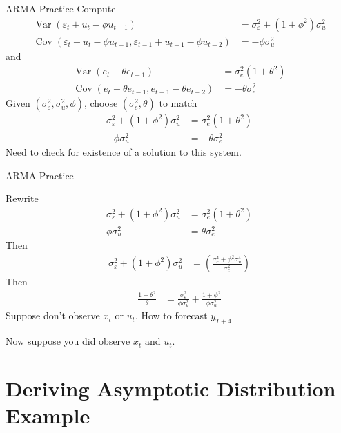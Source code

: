 \documentclass[handout]{beamer}
\newcommand{\Cov}{\operatorname{Cov}}
\newcommand{\Var}{\operatorname{Var}}
\begin{document}
\begin{frame}[shrink]{ARMA Practice}
Compute
\begin{align*}
  \Var(\varepsilon_t+u_t-\phi u_{t-1})
  &=
  \sigma^2_\varepsilon
  +
  (1+\phi^2)
  \sigma^2_u
  \\
  \Cov(
    \varepsilon_t+u_t-\phi u_{t-1}
    ,
    \varepsilon_{t-1}+u_{t-1}-\phi u_{t-2}
  )
  &=
  -\phi \sigma^2_u
\end{align*}
and
\begin{align*}
  \Var(e_t - \theta e_{t-1})
  &=
  \sigma^2_e
  (1+\theta^2)
  \\
  \Cov(
    e_t - \theta e_{t-1},
    e_{t-1} - \theta e_{t-2}
  )
  &=
  -
  \theta
  \sigma^2_e
\end{align*}
Given $(\sigma^2_\varepsilon,\sigma^2_u,\phi)$, choose
$(\sigma^2_e,\theta)$ to match
\begin{align*}
  \sigma^2_\varepsilon
  +
  (1+\phi^2)
  \sigma^2_u
  &=
  \sigma^2_e
  (1+\theta^2)
  \\
  -\phi \sigma^2_u
  &=
  -
  \theta
  \sigma^2_e
\end{align*}
Need to check for existence of a solution to this system.
\end{frame}


\begin{frame}[shrink]{ARMA Practice}

Rewrite
\begin{align*}
  \sigma^2_\varepsilon
  +
  (1+\phi^2)
  \sigma^2_u
  &=
  \sigma^2_e
  (1+\theta^2)
  \\
  \phi \sigma^2_u
  &=
  \theta
  \sigma^2_e
\end{align*}
Then
\begin{align*}
  \sigma^2_\varepsilon
  +
  (1+\phi^2)
  \sigma^2_u
  &=
  \left(
    \frac{\sigma^4_e+\phi^2 \sigma^4_u}{\sigma^2_e}
  \right)
\end{align*}
Then
\begin{align*}
  \frac{1+\theta^2}{\theta}
  &=
  \frac{\sigma^2_\varepsilon}{\phi \sigma^2_u}
  +
  \frac{1+\phi^2}{\phi\sigma^2_u}
\end{align*}
Suppose don't observe $x_t$ or $u_t$.
How to forecast $y_{T+4}$

Now suppose you did observe $x_t$ and $u_t$.

\end{frame}





\section{Deriving Asymptotic Distribution Example}
\end{document}
